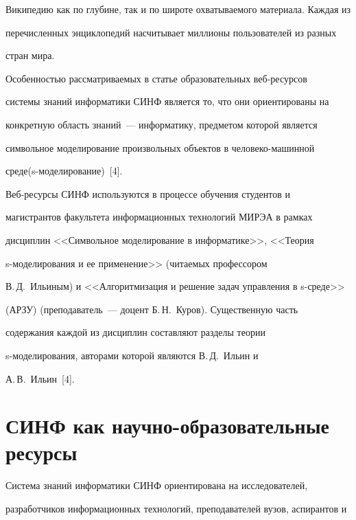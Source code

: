Википедию как по глубине, так и по широте охватываемого материала. Каждая из


пе\-ре\-чис\-лен\-ных энциклопедий насчитывает миллионы пользователей из разных


стран мира.





  Особенностью рассматриваемых в статье образовательных веб-ре\-сур\-сов


сис\-те\-мы знаний информатики СИНФ является то, что они ориентированы на


конкретную область знаний~--- информатику, предметом которой является


символьное моделирование произвольных объектов в че\-ло\-ве\-ко-ма\-шин\-ной


среде\linebreak (\mbox{s-мо}\-де\-ли\-ро\-ва\-ние)~[4].





  Веб-ресурсы СИНФ используются в процессе обучения студентов и


магистрантов факультета информационных технологий МИРЭА в рамках


дис\-цип\-лин <<Символьное моделирование в информатике>>, <<Теория


  s-мо\-де\-ли\-ро\-ва\-ния и ее применение>> (читаемых профессором


В.\,Д.~Ильиным) и <<Алгоритмизация и решение задач управления в s-сре\-де>>


(АРЗУ) (преподаватель~--- доцент Б.\,Н.~Куров). Существенную часть


содержания каждой из дисциплин составляют разделы теории


  s-мо\-де\-ли\-ро\-ва\-ния, авторами которой являются В.\,Д.~Ильин и


А.\,В.~Иль\-ин~[4].





\section{СИНФ как научно-образовательные ресурсы}





  Система знаний информатики СИНФ ориентирована на исследователей,


разработчиков информационных технологий, преподавателей вузов, аспирантов и


